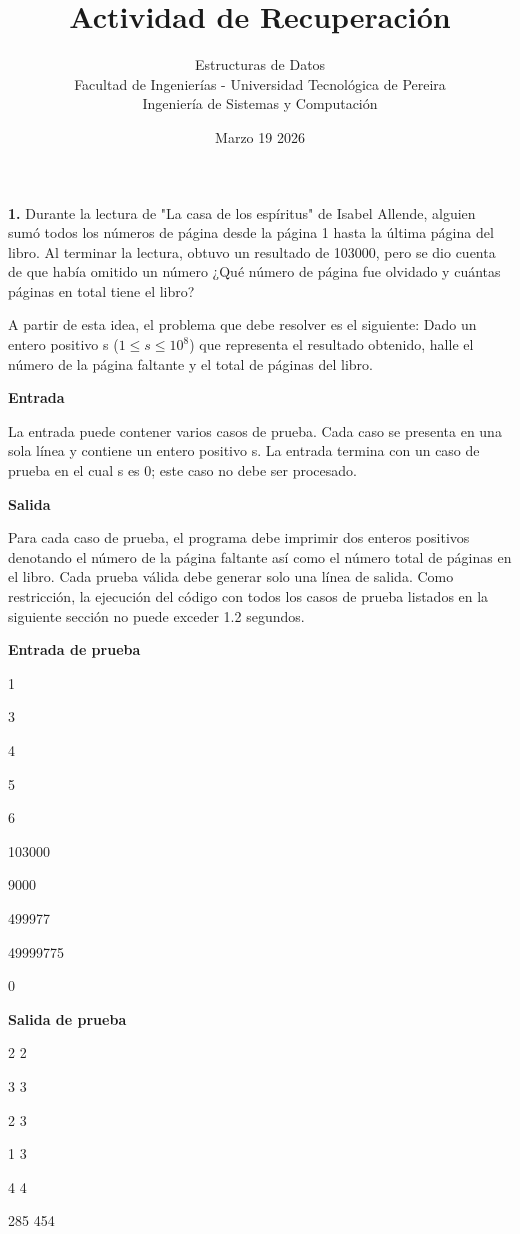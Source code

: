 \documentclass{article}
\title{Actividad de Recuperación}
\author{Estructuras de Datos \\ Facultad de Ingenierías - Universidad Tecnológica de Pereira \\ Ingeniería de Sistemas y Computación}
\date{Marzo 19 2026}
\begin{document}
\maketitle
\thispagestyle{empty}

\textbf{1. } Durante la lectura de "La casa de los espíritus" de Isabel Allende, alguien sumó todos los números de página desde la página 1 hasta la última página del libro. Al terminar la lectura, obtuvo un resultado de 103000, pero se dio cuenta de que había omitido un número ¿Qué número de página fue olvidado y cuántas páginas en total tiene el libro?

A partir de esta idea, el problema que debe resolver es el siguiente:
Dado un entero positivo s ($1 \leq s \leq 10^8$) que representa el resultado obtenido, halle el número de la página faltante y el total de páginas del libro.


\textbf{Entrada}

La entrada puede contener varios casos de prueba. Cada caso se presenta en una sola línea y contiene un entero positivo s. La entrada termina con un caso de prueba en el cual s es 0; este caso no debe ser procesado.

\textbf{Salida}

Para cada caso de prueba, el programa debe imprimir dos enteros positivos denotando el número de la página faltante así como el número total de páginas en el libro. Cada prueba válida debe generar solo una línea de salida. Como restricción, la ejecución del código con todos los casos de prueba listados en la siguiente sección no puede exceder 1.2 segundos. \newline

\textbf{Entrada de prueba }

1

3

4

5

6

103000

9000

499977

49999775

0 \newline

\textbf{Salida de prueba }

2 2

3 3

2 3

1 3

4 4

285 454
\end{document}

